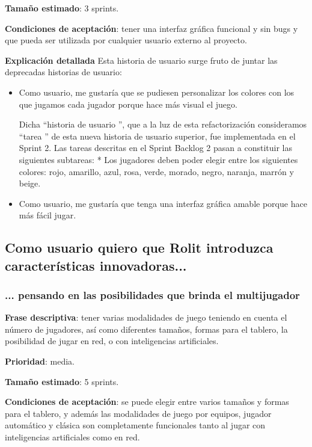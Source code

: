 \documentclass[../../FINAL/Scrum/SCRUM.tex]{subfiles}
\begin{document}
\textbf{Tamaño estimado}: 3 sprints.

\textbf{Condiciones de aceptación}: tener una interfaz gráfica funcional y sin bugs y que pueda ser utilizada por cualquier usuario externo al proyecto.

\textbf{Explicación detallada}
Esta historia de usuario surge fruto de juntar las deprecadas historias de usuario:
\begin{itemize}
\item  Como usuario, me gustaría que se pudiesen personalizar los colores con los que jugamos cada jugador porque hace más visual el juego. 

    Dicha  ``historia de usuario '', que a la luz de esta refactorización consideramos  ``tarea '' de esta nueva historia de usuario superior, fue implementada en el Sprint 2. Las tareas descritas en el Sprint Backlog 2 pasan a constituir las siguientes subtareas:
     * Los jugadores deben poder elegir entre los siguientes colores: rojo, amarillo, azul, rosa, verde, morado, negro, naranja, marrón y beige.

\item  Como usuario, me gustaría que tenga una interfaz gráfica amable porque hace más fácil jugar.
\end{itemize}

\subsection{Como usuario quiero que Rolit introduzca características innovadoras...}
\subsubsection{... pensando en las posibilidades que brinda el multijugador}
\textbf{Frase descriptiva}: tener varias modalidades de juego teniendo en cuenta el número de jugadores, así como diferentes tamaños, formas para el tablero, la posibilidad de jugar en red, o con inteligencias artificiales.

\textbf{Prioridad}: media.

\textbf{Tamaño estimado}: 5 sprints.

\textbf{Condiciones de aceptación}: se puede elegir entre varios tamaños y formas para el tablero, y además las modalidades de juego por equipos, jugador automático y clásica son completamente funcionales tanto al jugar con inteligencias artificiales como en red.
\end{document}
